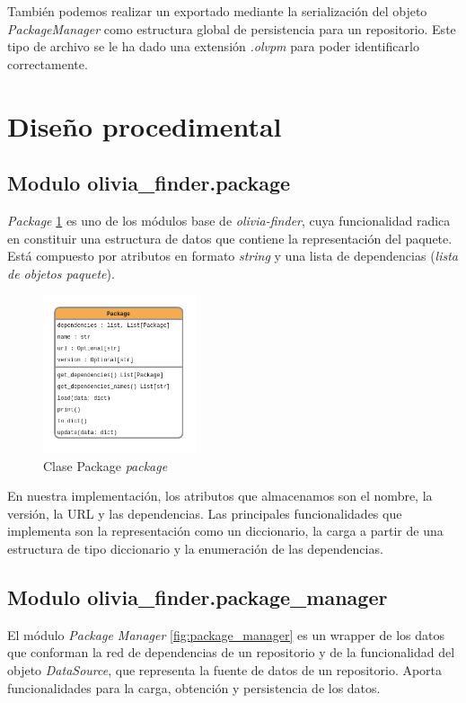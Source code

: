 También podemos realizar un exportado mediante la serialización del objeto \textit{PackageManager}
como estructura global de persistencia para un repositorio. Este tipo de archivo se le ha dado una
extensión \textit{.olvpm} para poder identificarlo correctamente.

\section{Diseño procedimental}

\subsection{Modulo olivia\_finder.package}

\textit{Package} \ref{fig:package} es uno de los módulos base de \textit{olivia-finder}, cuya funcionalidad radica en
constituir una estructura de datos que contiene la representación del paquete. Está compuesto por
atributos en formato \textit{string} y una lista de dependencias (\textit{lista de objetos paquete}).

\begin{figure}[ht!]
    \centering
    \includegraphics[width=0.4\textwidth]{img/anexos/package.png}
    \caption{Clase Package \textit{package}}
    \label{fig:package}
\end{figure}

En nuestra implementación, los atributos que almacenamos son el nombre, la versión, la URL y las
dependencias. Las principales funcionalidades que implementa son la representación como un
diccionario, la carga a partir de una estructura de tipo diccionario y la enumeración de las
dependencias.

\subsection{Modulo olivia\_finder.package\_manager}

El módulo \textit{Package Manager} \ref{fig:package_manager} es un wrapper de los datos que conforman la red de dependencias de
un repositorio y de la funcionalidad del objeto \textit{DataSource}, que representa la fuente de
datos de un repositorio. Aporta funcionalidades para la carga, obtención y persistencia de los datos.

